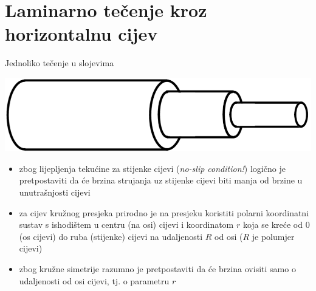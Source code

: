 \documentclass{beamer}
\begin{document}
\section{Laminarno tečenje kroz horizontalnu cijev}
\begin{frame}{Jednoliko tečenje u slojevima}

\begin{center}
\includegraphics[width=0.5\paperwidth]{slike/slika5.PNG}
\par\end{center}
\begin{itemize}
\item zbog lijepljenja tekućine za stijenke cijevi (\emph{no-slip condition!})
logično je pretpostaviti da će brzina strujanja uz stijenke cijevi
biti manja od brzine u unutrašnjosti cijevi
\item za cijev kružnog presjeka prirodno je na presjeku koristiti polarni
koordinatni sustav s ishodištem u centru (na osi) cijevi i koordinatom
$r$ koja se kreće od $0$ (os cijevi) do ruba (stijenke) cijevi na
udaljenosti $R$ od osi ($R$ je polumjer cijevi)
\item zbog kružne simetrije razumno je pretpostaviti da će brzina ovisiti
samo o udaljenosti od osi cijevi, tj. o parametru $r$
\end{itemize}
\end{frame}
\end{document}

